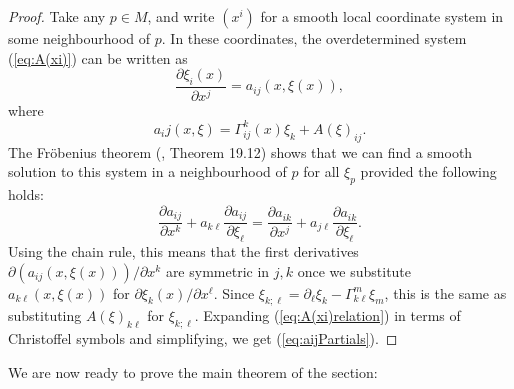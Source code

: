 \documentclass{amsart}
\numberwithin{equation}{section}
\newcommand{\del}{\partial}
\theoremstyle{plain}
\theoremstyle{definition}
\theoremstyle{remark}
\begin{document}
\begin{proof}
 Take any $p\in M$, and write $(x^i)$ for a smooth local coordinate system in some neighbourhood of $p$. In these coordinates, the overdetermined system (\ref{eq:A(xi)}) can be written as
 \[\frac{\del \xi_i(x)}{\del x^j} = a_{ij}(x, \xi(x)),\]
 where 
 \[a_ij(x, \xi) = \Gamma_{ij}^k(x) \xi_k + A(\xi)_{ij}.\]
 The Fr\"obenius theorem (\cite{LeeSM}, Theorem 19.12) shows that we can find a smooth solution to this system in a neighbourhood of $p$ for all $\xi_p$ provided the following holds:
 \begin{equation}\label{eq:aijPartials}
 \frac{\del a_{ij}}{\del x^k} + a_{k\ell} \frac{\del a_{ij}}{\del \xi_\ell} = \frac{\del a_{ik}}{\del x^j} + a_{j \ell} \frac{\del a_{ik}}{\del \xi_\ell}.
 \end{equation}
 Using the chain rule, this means that the first derivatives $\del(a_{ij}(x, \xi(x)))/\del x^k$ are symmetric in $j,k$ once we substitute $a_{k\ell}(x, \xi(x))$ for $\del \xi_k(x)/\del x^\ell$. Since $\xi_{k;\ell} = \del_\ell \xi_k - \Gamma_{k\ell}^m \xi_m$, this is the same as substituting $A(\xi)_{k\ell}$ for $\xi_{k;\ell}$. Expanding (\ref{eq:A(xi)relation}) in terms of Christoffel symbols and simplifying, we get (\ref{eq:aijPartials}).
\end{proof}

We are now ready to prove the main theorem of the section:
\end{document}
